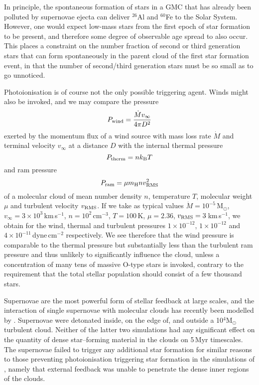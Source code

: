 \documentclass[useAMS,usenatbib,usegraphicx]{mn2e}
\begin{document}
In principle, the spontaneous formation of stars in a GMC that has already been polluted by supernovae ejecta can deliver $^{26}$Al and $^{60}$Fe to the Solar System. However, one would expect low-mass stars from the first epoch of star formation to be present, and therefore some degree of observable age spread to also occur. This places a constraint on the number fraction of second or third generation stars that can form spontaneously in the parent cloud of the first star formation event, in that the number of second/third generation stars must be so small as to go unnoticed. 

Photoionisation is of course not the only possible triggering agent. Winds might also be invoked, and we may compare the pressure 
\begin{equation}
P_{\rm wind} = \frac{\dot{M}v_{\infty}}{4\pi D^{2}}
\end{equation}
 exerted by the momentum flux of a wind source with mass loss rate $\dot{M}$ and terminal velocity $v_{\infty}$ at a distance $D$ with the internal  thermal pressure 
\begin{equation}
P_{\rm therm} = nk_{\rm B}T
\end{equation}
 and ram pressure 
\begin{equation}
P_{\rm ram} = \mu m_{\rm H}nv_{\rm RMS}^{2} 
\end{equation}
of a molecular cloud of mean number density $n$, temperature $T$, molecular weight $\mu$ and turbulent velocity $v_{\rm RMS}$. If we take as typical values $\dot{M}=10^{-5}$\,M$_{\odot}$, $v_{\infty}=3\times10^{3}$\,km\,s$^{-1}$, $n=10^{2}$\,cm$^{-3}$, $T=100$\,K, $\mu=2.36$, $v_{\rm RMS}=3$\,km\,s$^{-1}$, we obtain for the wind, thermal and turbulent pressures $1\times10^{-12}$, $1\times10^{-12}$ and $4\times10^{-11}$\,dyne\,cm$^{-2}$ respectively. We see therefore that the wind pressure is comparable to the thermal pressure but substantially less than the turbulent ram pressure and thus unlikely to significantly influence the cloud, unless a concentration of many tens of massive O-type stars is invoked, contrary to the requirement that the total stellar population should consist of a few thousand stars.

Supernovae are the most powerful form of stellar feedback at large scales, and the interaction of single supernovae with molecular clouds has recently been modelled by \cite{Iffrig15}. Supernovae were detonated inside, on the edge of, and outside a 10$^{4}$M$_{\odot}$ turbulent cloud. Neither of the latter two simulations had any significant effect on the quantity of dense star--forming material in the clouds on 5\,Myr timescales. The supernovae failed to trigger any additional star formation for similar reasons to those preventing photoionisation triggering star formation in the simulations of \cite{Dale12a}, namely that external feedback was unable to penetrate the dense inner regions of the clouds.
\end{document}
